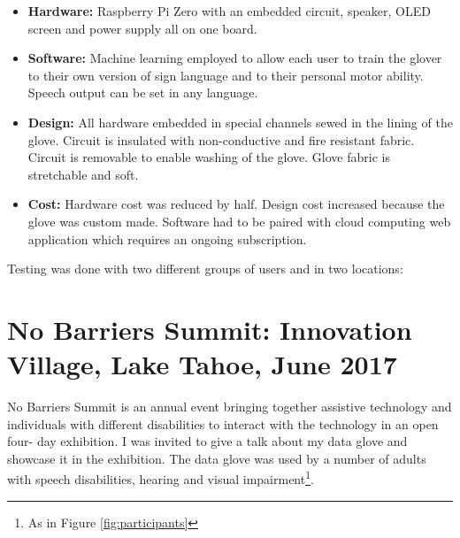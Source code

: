 \begin{itemize}
\item \textbf{Hardware:} Raspberry Pi Zero with an embedded circuit, speaker, OLED screen and power supply all on one board.

\item \textbf{Software:} Machine learning employed to allow each user to train the glover to their own version of sign language and to their personal motor ability. Speech output can be set in any language. 

\item \textbf{Design:} All hardware embedded in special channels sewed in the lining of the glove.  Circuit is insulated with non-conductive and fire resistant fabric.  Circuit is removable to enable washing of the glove. Glove fabric is stretchable and soft.  

\item \textbf{Cost:} Hardware cost was reduced by half. Design cost increased because the glove was custom made. Software had to be paired with cloud computing web application which requires an ongoing subscription. 
\end{itemize}

Testing was done with two different groups of users and in two locations:

\section{No Barriers Summit: Innovation Village, Lake Tahoe, June 2017}

No Barriers Summit is an annual event bringing together assistive technology and individuals with different disabilities to interact with the technology in an open four- day exhibition. I was invited to give a talk about my data glove and showcase it in the exhibition. The data glove was used by a number of adults with speech disabilities, hearing and visual impairment\footnote{As in Figure \ref{fig:participants}}.

